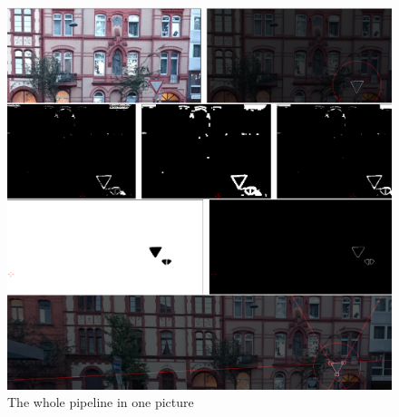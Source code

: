 \documentclass{report}
\begin{document}
\begin{figure}
  \centering
    \includegraphics[width=1\textwidth, frame]{src/hardone/merged}
  \caption{The whole pipeline in one picture}
  \label{img:hardone}
\end{figure}
\end{document}
